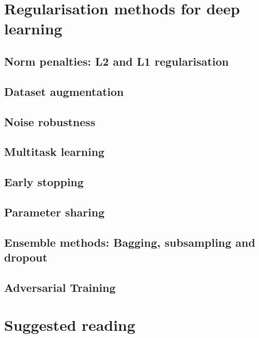 \section{Regularisation methods for deep learning}




\subsection{Norm penalties: L2 and L1 regularisation}
\subsection{Dataset augmentation}
\subsection{Noise robustness}
\subsection{Multitask learning}
\subsection{Early stopping}
\subsection{Parameter sharing}
\subsection{Ensemble methods: Bagging, subsampling and dropout}
\subsection{Adversarial Training}


\section{Suggested reading}

